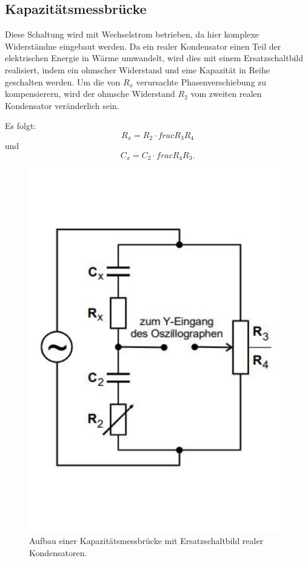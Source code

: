 \subsection{Kapazitätsmessbrücke}
\label{sec:Kapazität}

Diese Schaltung wird mit Wechselstrom betrieben, da hier komplexe Widerständne eingebaut werden.
Da ein realer Kondensator einen Teil der elektrischen Energie in Wärme umwandelt, wird dies mit einem Ersatzschaltbild realisiert, indem ein ohmscher Widerstand und eine Kapazität in Reihe geschalten werden.
Um die von $R_x$ verursachte Phasenverschiebung zu kompensierern, wird der ohmsche Widerstand $R_2$ vom zweiten realen Kondensator veränderlich sein.

Es folgt:
\begin{equation}
    R_x = R_2 \cdot frac{R_3}{R_4}
\end{equation}
und
\begin{equation}
    C_x = C_2 \cdot frac{R_4}{R_3} .
\end{equation}

\begin{figure}
    \centering
    \includegraphics[width=\textwidth]{KapBruecke.pdf}
    \caption{Aufbau einer Kapazitätsmessbrücke mit Ersatzschaltbild realer Kondensatoren.\cite{[5]anleitung}}
\end{figure}

